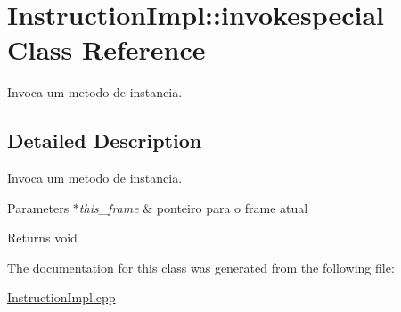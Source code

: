 \hypertarget{class_instruction_impl_1_1invokespecial}{}\section{Instruction\+Impl\+:\+:invokespecial Class Reference}
\label{class_instruction_impl_1_1invokespecial}


Invoca um metodo de instancia.  




\subsection{Detailed Description}
Invoca um metodo de instancia. 


\begin{DoxyParams}{Parameters}
{\em $\ast$this\+\_\+frame} & ponteiro para o frame atual \\
\hline
\end{DoxyParams}
\begin{DoxyReturn}{Returns}
void 
\end{DoxyReturn}


The documentation for this class was generated from the following file\+:\begin{DoxyCompactItemize}
\item 
\hyperlink{_instruction_impl_8cpp}{Instruction\+Impl.\+cpp}\end{DoxyCompactItemize}
